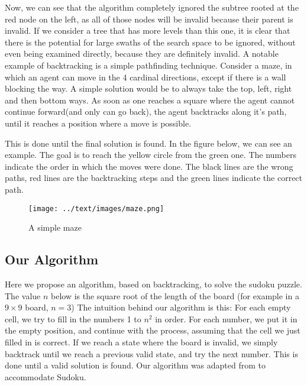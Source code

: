 \documentclass[16pt]{article}
\begin{document}
Now, we can see that the algorithm completely ignored the subtree rooted at the red node on the left, as all of those nodes will be invalid because their parent is invalid.
If we consider a tree that has more levels than this one, it is clear that there is the potential for large swaths of the search space to be ignored, without even being examined directly, because they are definitely invalid.
\newline
\newline
A notable example of backtracking is a simple pathfinding technique.
Consider a maze, in which an agent can move in the 4 cardinal directions, except if there is a wall blocking the way.
A simple solution would be to always take the top, left, right and then bottom ways. As soon as one reaches a square where the agent cannot continue forward(and only can go back), 
the agent backtracks along it's path, until it reaches a position where a move is possible.

This is done until the final solution is found.
\newline
\newline
In the figure below, we can see an example. The goal is to reach the yellow circle from the green one.
The numbers indicate the order in which the moves were done. The black lines are the wrong paths, red lines are the backtracking steps and the green lines indicate the correct path.
\begin{figure}[H]
    \centering
    \texttt{[image: ../text/images/maze.png]}
    \caption{A simple maze}
\end{figure}

\subsection {Our Algorithm}
Here we propose an algorithm, based on backtracking, to solve the sudoku puzzle.
The value $n$ below is the square root of the length of the board (for example in a $9 \times 9 $ board, $n = 3$)
\newline
\newline
The intuition behind our algorithm is this: 
For each empty cell, we try to fill in the numbers 1 to $n^2$ in order. For each number, we put it in the empty position, and continue with the process, assuming that the cell we just filled in is correct.
If we reach a state where the board is invalid, we simply backtrack until we reach a previous valid state, and try the next number.
\newline
This is done until a valid solution is found.
\newline
\newline
Our algorithm was adapted from \cite{backtracking_paper} to accommodate Sudoku.
\end{document}
